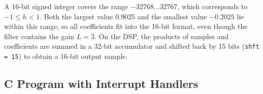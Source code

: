 \documentclass[a4paper,11pt]{article}
\begin{document}
	A 16-bit signed integer covers the range $-32768 \dots 32767$, which corresponds to $-1 \le h < 1$. Both the largest value $0.9025$ and the smallest value $-0.2025$ lie within this range, so all coefficients fit into the 16-bit format, even though the filter contains the gain $L = 3$. On the DSP, the products of samples and coefficients are summed in a 32-bit accumulator and shifted back by 15 bits (\texttt{shft = 15}) to obtain a 16-bit output sample.
	
	\subsection{C Program with Interrupt Handlers}
	
	\noindent{}
	
\end{document}
